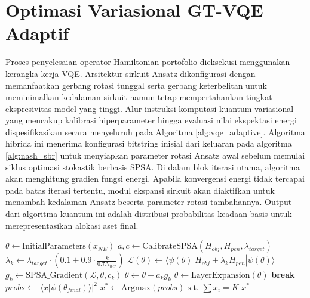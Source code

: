 \section{Optimasi Variasional GT-VQE Adaptif}
Proses penyelesaian operator Hamiltonian portofolio dieksekusi menggunakan kerangka kerja VQE. Arsitektur sirkuit Ansatz dikonfigurasi dengan memanfaatkan gerbang rotasi tunggal serta gerbang keterbelitan untuk meminimalkan kedalaman sirkuit namun tetap mempertahankan tingkat ekspresivitas model yang tinggi. Alur instruksi komputasi kuantum variasional yang mencakup kalibrasi hiperparameter hingga evaluasi nilai ekspektasi energi dispesifikasikan secara menyeluruh pada Algoritma \ref{alg:vqe_adaptive}. Algoritma hibrida ini menerima konfigurasi bitstring inisial dari keluaran pada algoritma \ref{alg:nash_sbr} untuk menyiapkan parameter rotasi Ansatz awal sebelum memulai siklus optimasi stokastik berbasis SPSA. Di dalam blok iterasi utama, algoritma akan menghitung gradien fungsi energi. Apabila konvergensi energi tidak tercapai pada batas iterasi tertentu, modul ekspansi sirkuit akan diaktifkan untuk menambah kedalaman Ansatz beserta parameter rotasi tambahannya. Output dari algoritma kuantum ini adalah distribusi probabilitas keadaan basis untuk merepresentasikan alokasi aset final.

\begin{algorithm}[ht]
\caption{Adaptive HE-VQE dengan Penalty Annealing dan Nash Warm-Start}
\label{alg:vqe_adaptive}
\begin{algorithmic}[1]
    \State $\theta \gets \text{InitialParameters}(x_{NE})$ 
        \State $a, c \gets \text{CalibrateSPSA}(H_{obj}, H_{pen}, \lambda_{target})$ 
            \State $\lambda_k \gets \lambda_{target} \cdot (0.1 + 0.9 \cdot \frac{k}{0.7 N_{iter}})$ 
            \State $\mathcal{L}(\theta) \gets \langle \psi(\theta) | H_{obj} + \lambda_k H_{pen} | \psi(\theta) \rangle$
            \State $g_k \gets \text{SPSA\_Gradient}(\mathcal{L}, \theta, c_k)$
            \State $\theta \gets \theta - a_k g_k$ 
        \EndFor
        \State $\theta \gets \text{LayerExpansion}(\theta)$ 
         \textbf{break} \EndIf
    \EndFor
    \State $probs \gets |\langle x | \psi(\theta_{final}) \rangle|^2$ 
    \State $x^* \gets \text{Argmax}(probs) \text{ s.t. } \sum x_i = K$
    \State \Return $x^*$
\EndProcedure
\end{algorithmic}
\end{algorithm}
